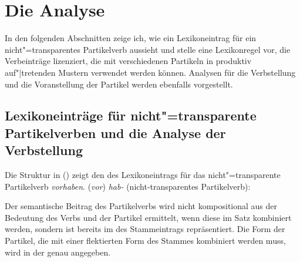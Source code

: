 \section{Die Analyse}
\label{sec-pv-anal}

In den folgenden Abschnitten zeige ich, wie ein Lexikoneintrag
für ein nicht"=transparentes Partikelverb aussieht und stelle
eine Lexikonregel vor, die Verbeinträge lizenziert, die mit verschiedenen
Partikeln in produktiv auf"|tretenden Mustern verwendet werden können.
Analysen für die Verbstellung und die Voranstellung der Partikel
werden ebenfalls vorgestellt.

\subsection{Lexikoneinträge für nicht"=transparente Partikelverben und die Analyse der Verbstellung}
\label{le-nontr-part-verb}

Die Struktur in () zeigt den \locw des Lexikoneintrags für das
nicht"=transparente Partikelverb \emph{vorhaben}.
%
\eas
(\emph{vor}) \emph{hab-} (nicht-transparentes Partikelverb):\label{le-vorhaben}
\\
\zs

\noindent
Der semantische Beitrag des Partikelverbs wird nicht kompositional aus der Bedeutung
des Verbs und der Partikel ermittelt, wenn diese im Satz kombiniert werden, sondern
ist bereits im \contw des Stammeintrags repräsentiert. Die Form der Partikel,
die mit einer flektierten Form des Stammes kombiniert werden muss, wird in der
\compsl genau angegeben.

